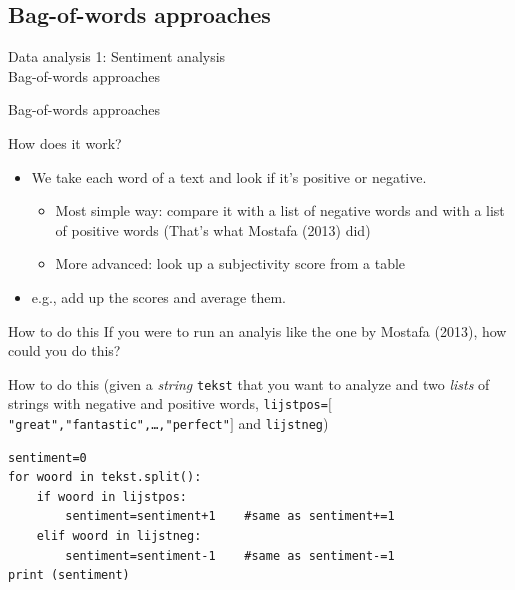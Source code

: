 \documentclass{beamer}
\begin{document}
\subsection{Bag-of-words approaches}
\begin{frame}
Data analysis 1: Sentiment analysis\\
Bag-of-words approaches
\end{frame}


\begin{frame}{Bag-of-words approaches}
\begin{block}{How does it work?}
\begin{itemize}
\item We take each word of a text and look if it's positive or negative.
\begin{itemize}
\item<2-> Most simple way: compare it with a list of negative words and with a list of positive words {\small(That's what Mostafa (2013) did)}
\item<3-> More advanced: look up a subjectivity score from a table 
\end{itemize}
\item<4-> e.g., add up the scores and average them.
\end{itemize}
\end{block}
\end{frame}


\begin{frame}[fragile]{How to do this}
If you were to run an analyis like the one by Mostafa (2013), how could you do this?
\end{frame}

\begin{frame}[fragile]{How to do this}
\scriptsize{ 
(given a \emph{string} \texttt{tekst} that you want to analyze and two 
\emph{lists} of strings with negative and positive words, 
\texttt{lijstpos=$[$"great","fantastic",\ldots,"perfect"$]$} and \texttt{lijstneg})\\
}

\begin{lstlisting}
sentiment=0
for woord in tekst.split():
    if woord in lijstpos:
        sentiment=sentiment+1    #same as sentiment+=1
    elif woord in lijstneg:
        sentiment=sentiment-1    #same as sentiment-=1
print (sentiment)
\end{lstlisting}
\end{frame}
\end{document}
